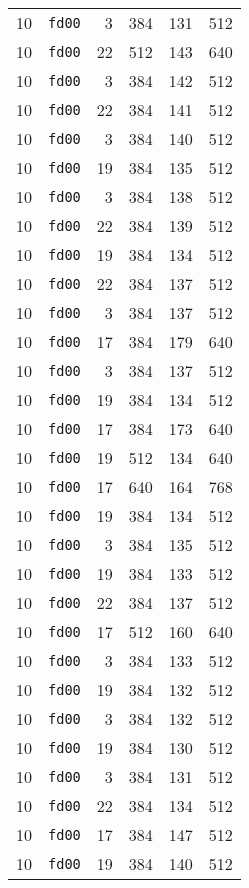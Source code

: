 \documentclass{article}
\begin{document}
\begin{table}[h!]
\begin{tabular}{llrrrl}
    10 & \texttt{fd00} & 3 & 384 & 131 & 512 \\
    10 & \texttt{fd00} & 22 & 512 & 143 & 640 \\
    10 & \texttt{fd00} & 3 & 384 & 142 & 512 \\
    10 & \texttt{fd00} & 22 & 384 & 141 & 512 \\
    10 & \texttt{fd00} & 3 & 384 & 140 & 512 \\
    10 & \texttt{fd00} & 19 & 384 & 135 & 512 \\
    10 & \texttt{fd00} & 3 & 384 & 138 & 512 \\
    10 & \texttt{fd00} & 22 & 384 & 139 & 512 \\
    10 & \texttt{fd00} & 19 & 384 & 134 & 512 \\
    10 & \texttt{fd00} & 22 & 384 & 137 & 512 \\
    10 & \texttt{fd00} & 3 & 384 & 137 & 512 \\
    10 & \texttt{fd00} & 17 & 384 & 179 & 640 \\
    10 & \texttt{fd00} & 3 & 384 & 137 & 512 \\
    10 & \texttt{fd00} & 19 & 384 & 134 & 512 \\
    10 & \texttt{fd00} & 17 & 384 & 173 & 640 \\
    10 & \texttt{fd00} & 19 & 512 & 134 & 640 \\
    10 & \texttt{fd00} & 17 & 640 & 164 & 768 \\
    10 & \texttt{fd00} & 19 & 384 & 134 & 512 \\
    10 & \texttt{fd00} & 3 & 384 & 135 & 512 \\
    10 & \texttt{fd00} & 19 & 384 & 133 & 512 \\
    10 & \texttt{fd00} & 22 & 384 & 137 & 512 \\
    10 & \texttt{fd00} & 17 & 512 & 160 & 640 \\
    10 & \texttt{fd00} & 3 & 384 & 133 & 512 \\
    10 & \texttt{fd00} & 19 & 384 & 132 & 512 \\
    10 & \texttt{fd00} & 3 & 384 & 132 & 512 \\
    10 & \texttt{fd00} & 19 & 384 & 130 & 512 \\
    10 & \texttt{fd00} & 3 & 384 & 131 & 512 \\
    10 & \texttt{fd00} & 22 & 384 & 134 & 512 \\
    10 & \texttt{fd00} & 17 & 384 & 147 & 512 \\
    10 & \texttt{fd00} & 19 & 384 & 140 & 512 \\

\end{tabular}
\end{table}
\end{document}
